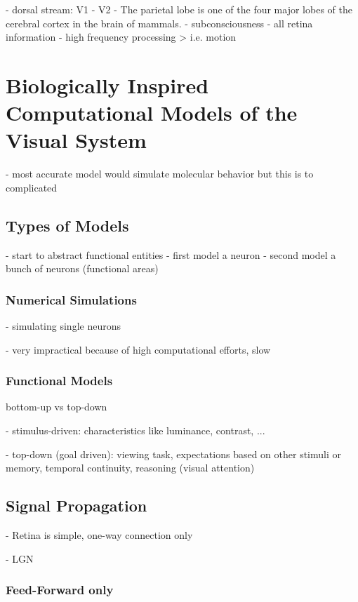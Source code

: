 		- dorsal stream: V1 - V2 - The parietal lobe is one of the four major lobes of the cerebral cortex in the brain of mammals.
			- subconsciousness
			- all retina information
			- high frequency processing > i.e. motion
	
\chapter{Biologically Inspired Computational Models of the Visual System}

	- most accurate model would simulate molecular behavior but this is to complicated
	
	\section{Types of Models}
		
		- start to abstract functional entities
			- first model a neuron
			- second model a bunch of neurons (functional areas)
		
		\subsection{Numerical Simulations}
		
			- simulating single neurons
		
			- very impractical because of high computational efforts, slow
		
		\subsection{Functional Models}

			bottom-up vs top-down
			
			- stimulus-driven: characteristics like luminance, contrast, ...
			
			- top-down (goal driven): viewing task, expectations based on other stimuli or memory, temporal continuity, reasoning (visual attention)
	
		
	\section{Signal Propagation}
	
		- Retina is simple, one-way connection only
		
		- LGN
	
		\subsection{Feed-Forward only}
		
